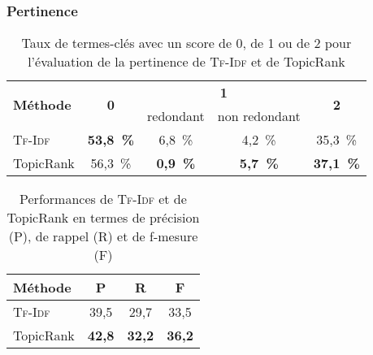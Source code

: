       \subsubsection{Pertinence}
      \label{subsubsec:main-automatic_evaluation_of_keyphrase_annotation-results-topicrank-pertinence}
      \begin{table}[h!]
          \centering
          \begin{tabular}{l|c|c|c|c}
            \toprule
            \multirow{2}{*}{\textbf{Méthode}} & \multirow{2}{*}{\textbf{0}} & \multicolumn{2}{c|}{\textbf{1}} & \multirow{2}{*}{\textbf{2}}\\
            \cline{3-4}
            & & \multicolumn{1}{p{.175\linewidth}|}{\centering{}redondant} & \multicolumn{1}{p{.175\linewidth}|}{\centering{}non redondant} &\\
            \hline
            \textsc{Tf-Idf} & \textbf{53,8~\%} & 6,8~\% & 4,2~\% & 35,3~\%\\
            TopicRank & 56,3~\% & \textbf{0,9~\%} & \textbf{5,7~\%} & \textbf{37,1~\%}\\
            \bottomrule
          \end{tabular}
          \caption{Taux de termes-clés avec un score de 0, de 1 ou de 2 pour
                   l'évaluation de la pertinence de \textsc{Tf-Idf} et de
                   TopicRank
                   \label{tab:main-automatic_evaluation_of_keyphrase_annotation-results-topicrank-pertinence_score_ratio}}
        \end{table}

        \begin{table}[h!]
          \centering
          \begin{tabular}{l|ccc}
            \toprule
            \textbf{Méthode} & \textbf{P} & \textbf{R} & \textbf{F}\\
            \hline
            \textsc{Tf-Idf} & 39,5 & 29,7 & 33,5\\
            TopicRank & \textbf{42,8} & \textbf{32,2} & \textbf{36,2}\\
            \bottomrule
          \end{tabular}
          \caption[
            Performances de \textsc{Tf-Idf} et de TopicRank en termes de
            précision, de rappel et de f-mesure
          ]{
            Performances de \textsc{Tf-Idf} et de TopicRank en termes de
            précision (P), de rappel (R) et de f-mesure (F)
            \label{tab:main-automatic_evaluation_of_keyphrase_annotation-results-topicrank-prf}}
        \end{table}
    
